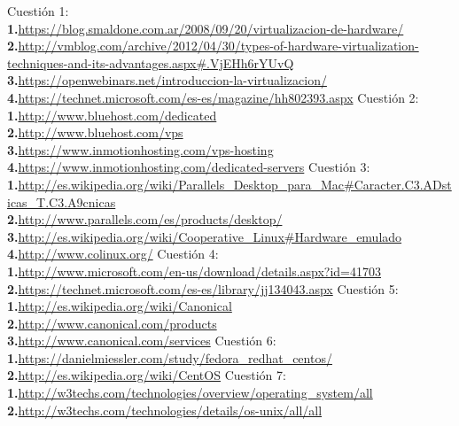 \documentclass[a4paper, 11pt]{article} %
\begin{document}
\pagebreak
\begin{thebibliography}{X}
 Cuestión 1:\\ 
 \textbf{1.}\url{https://blog.smaldone.com.ar/2008/09/20/virtualizacion-de-hardware/ }\\
 \textbf{2.}\url{http://vmblog.com/archive/2012/04/30/types-of-hardware-virtualization-techniques-and-its-advantages.aspx#.VjEHh6rYUvQ}\\
 \textbf{3.}\url{https://openwebinars.net/introduccion-la-virtualizacion/}
 \textbf{4.}\url{https://technet.microsoft.com/es-es/magazine/hh802393.aspx}
 Cuestión 2:\\ 
 \textbf{1.}\url{http://www.bluehost.com/dedicated}\\
 \textbf{2.}\url{http://www.bluehost.com/vps}\\
 \textbf{3.}\url{https://www.inmotionhosting.com/vps-hosting}\\
 \textbf{4.}\url{https://www.inmotionhosting.com/dedicated-servers}
 Cuestión 3:\\
 \textbf{1.}\url{http://es.wikipedia.org/wiki/Parallels_Desktop_para_Mac#Caracter.C3.ADsticas_T.C3.A9cnicas}\\
 \textbf{2.}\url{http://www.parallels.com/es/products/desktop/}\\
 \textbf{3.}\url{http://es.wikipedia.org/wiki/Cooperative_Linux#Hardware_emulado}\\
 \textbf{4.}\url{http://www.colinux.org/}
 Cuestión 4:\\
	\textbf{1.}\url{http://www.microsoft.com/en-us/download/details.aspx?id=41703}
	\textbf{2.}\url{https://technet.microsoft.com/es-es/library/jj134043.aspx}
 Cuestión 5:\\
	\textbf{1.}\url{http://es.wikipedia.org/wiki/Canonical}\\
	\textbf{2.}\url{http://www.canonical.com/products}\\
	\textbf{3.}\url{http://www.canonical.com/services}
 Cuestión 6:\\
	\textbf{1.}\url{https://danielmiessler.com/study/fedora_redhat_centos/}\\
	\textbf{2.}\url{http://es.wikipedia.org/wiki/CentOS}
 Cuestión 7:\\
	\textbf{1.}\url{http://w3techs.com/technologies/overview/operating_system/all}\\
	\textbf{2.}\url{http://w3techs.com/technologies/details/os-unix/all/all}\\

\end{thebibliography}
\end{document}
